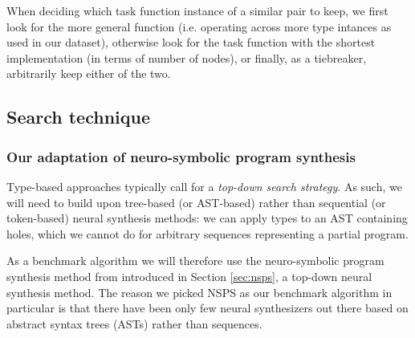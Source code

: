 \documentclass{article}
\begin{document}


When deciding which task function instance of a similar pair to keep,
we first look for the more general function (i.e. operating across more type intances as used in our dataset),
otherwise look for the task function with the shortest implementation (in terms of number of nodes),
or finally, as a tiebreaker, arbitrarily keep either of the two.

\subsection{Search technique}

\subsubsection{Our adaptation of neuro-symbolic program synthesis} \label{sec:ournsps}

Type-based approaches typically call for a \emph{top-down search strategy}.
As such, we will need to build upon tree-based (or AST-based) rather than sequential (or token-based) neural synthesis methods:
we can apply types to an AST containing holes,
which we cannot do for arbitrary sequences representing a partial program.

As a benchmark algorithm we will therefore use the neuro-symbolic program synthesis method from \citet{nsps} introduced in Section \ref{sec:nsps},
a top-down neural synthesis method.
The reason we picked NSPS as our benchmark algorithm in particular is that there have been only few neural synthesizers out there based on abstract syntax trees (ASTs) rather than sequences.
\end{document}
